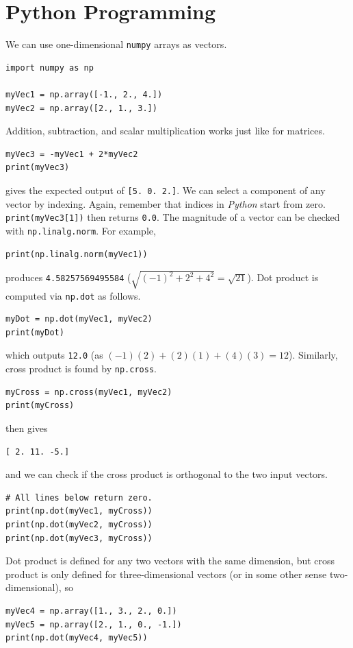 \section{Python Programming}
\label{section:ch4python}
We can use one-dimensional \verb|numpy| arrays as vectors. 
\begin{lstlisting}
import numpy as np

myVec1 = np.array([-1., 2., 4.])
myVec2 = np.array([2., 1., 3.])
\end{lstlisting}
Addition, subtraction, and scalar multiplication works just like for matrices.
\begin{lstlisting}
myVec3 = -myVec1 + 2*myVec2
print(myVec3)
\end{lstlisting}
gives the expected output of \verb|[5. 0. 2.]|. We can select a component of any vector by indexing. Again, remember that indices in \textit{Python} start from zero. \verb|print(myVec3[1])| then returns \verb|0.0|. The magnitude of a vector can be checked with \verb|np.linalg.norm|. For example,
\begin{lstlisting}
print(np.linalg.norm(myVec1))    
\end{lstlisting}
produces \verb|4.58257569495584| ($\sqrt{(-1)^2 + 2^2 + 4^2} = \sqrt{21}$). Dot product is computed via \verb|np.dot| as follows.
\begin{lstlisting}
myDot = np.dot(myVec1, myVec2)
print(myDot)
\end{lstlisting}
which outputs \verb|12.0| (as $(-1)(2) + (2)(1) + (4)(3) = 12$). Similarly, cross product is found by \verb|np.cross|.
\begin{lstlisting}
myCross = np.cross(myVec1, myVec2)
print(myCross)
\end{lstlisting}
then gives
\begin{lstlisting}
[ 2. 11. -5.]   
\end{lstlisting}
and we can check if the cross product is orthogonal to the two input vectors.
\begin{lstlisting}
# All lines below return zero.
print(np.dot(myVec1, myCross))
print(np.dot(myVec2, myCross))
print(np.dot(myVec3, myCross))
\end{lstlisting}
Dot product is defined for any two vectors with the same dimension, but cross product is only defined for three-dimensional vectors (or in some other sense two-dimensional), so
\begin{lstlisting}
myVec4 = np.array([1., 3., 2., 0.])
myVec5 = np.array([2., 1., 0., -1.])
print(np.dot(myVec4, myVec5))
\end{lstlisting}
